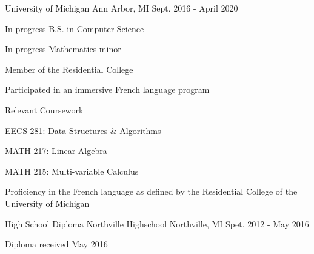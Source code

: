 


\begin{cventries}


\cventry
{} %
{University of Michigan} %
{Ann Arbor, MI} %
{Sept. 2016 - April 2020} %
{ %
\begin{cvitems}
\item {In progress B.S. in Computer Science}
\item {In progress Mathematics minor}
\item {Member of the Residential College}
\item {Participated in an immersive French language program}
\end{cvitems}
}

\cventryx
{Relevant Coursework} %
{ %
	\begin{cvitems}
		\item {EECS 281: Data Structures \& Algorithms}
		\item {MATH 217: Linear Algebra}
		\item {MATH 215: Multi-variable Calculus}
		\item {Proficiency in the French language as defined by the Residential College of the University of Michigan}
	\end{cvitems}
}


\cventry
{High School Diploma} %
{Northville Highschool} %
{Northville, MI} %
{Spet. 2012 - May 2016} %
{\begin{cvitems}
\item {Diploma received May 2016}
\end{cvitems}}

\end{cventries}